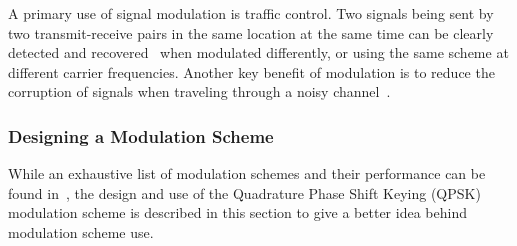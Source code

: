 A primary use of signal modulation is traffic control. Two signals being sent by two transmit-receive pairs in the same location at the same time can be clearly detected and recovered~\cite{pahlavan2005wireless} when modulated differently, or using the same scheme at different carrier frequencies. Another key benefit of modulation is to reduce the corruption of signals when traveling through a noisy channel~\cite{rappaport1996wireless}.

\subsubsection{Designing a Modulation Scheme}
While an exhaustive list of modulation schemes and their performance can be found in~\cite{mods}, the design and use of the Quadrature Phase Shift Keying (QPSK) modulation scheme is described in this section to give a better idea behind modulation scheme use.

